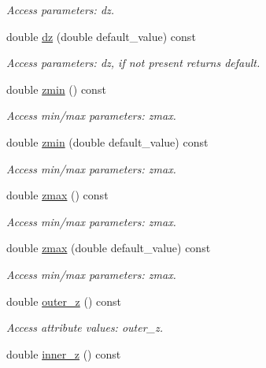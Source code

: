 \begin{DoxyCompactItemize}
\begin{DoxyCompactList}\small\item\em Access parameters\+: dz. \end{DoxyCompactList}\item 
double \hyperlink{struct_d_d4hep_1_1_x_m_l_1_1_dimension_a8d7eeaac78ca77b3f07b04fabb42c449}{dz} (double default\+\_\+value) const
\begin{DoxyCompactList}\small\item\em Access parameters\+: dz, if not present returns default. \end{DoxyCompactList}\item 
double \hyperlink{struct_d_d4hep_1_1_x_m_l_1_1_dimension_af9359e2e395f35f5903daf7e9d48e8dd}{zmin} () const
\begin{DoxyCompactList}\small\item\em Access min/max parameters\+: zmax. \end{DoxyCompactList}\item 
double \hyperlink{struct_d_d4hep_1_1_x_m_l_1_1_dimension_a207ec58d976189f0bcdbe1a849d58c78}{zmin} (double default\+\_\+value) const
\begin{DoxyCompactList}\small\item\em Access min/max parameters\+: zmax. \end{DoxyCompactList}\item 
double \hyperlink{struct_d_d4hep_1_1_x_m_l_1_1_dimension_acc8b08a3379fa8297c4068fe007fc892}{zmax} () const
\begin{DoxyCompactList}\small\item\em Access min/max parameters\+: zmax. \end{DoxyCompactList}\item 
double \hyperlink{struct_d_d4hep_1_1_x_m_l_1_1_dimension_aa17a3e5ef448c00dc4b1ef1dd0a0c6a8}{zmax} (double default\+\_\+value) const
\begin{DoxyCompactList}\small\item\em Access min/max parameters\+: zmax. \end{DoxyCompactList}\item 
double \hyperlink{struct_d_d4hep_1_1_x_m_l_1_1_dimension_aab2a4a9f3d1f107dcd805d02a29f425c}{outer\+\_\+z} () const
\begin{DoxyCompactList}\small\item\em Access attribute values\+: outer\+\_\+z. \end{DoxyCompactList}\item 
double \hyperlink{struct_d_d4hep_1_1_x_m_l_1_1_dimension_ad6fc4d9859b2a1651ab06ebef751ae4d}{inner\+\_\+z} () const

\end{DoxyCompactItemize}
